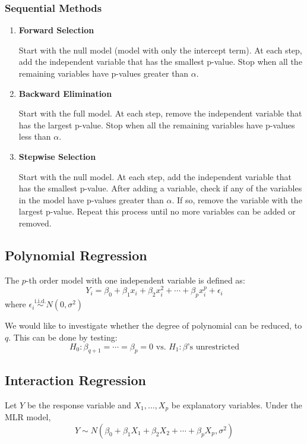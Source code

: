 \documentclass[11pt,a4paper]{article}
\begin{document}
\subsubsection{Sequential Methods}
\begin{enumerate}
    \item \textbf{Forward Selection} \par
        Start with the null model (model with only the intercept term). At each step, add the independent variable that has the smallest p-value. Stop when all the remaining variables have p-values greater than $\alpha$.
    
    \item \textbf{Backward Elimination} \par
        Start with the full model. At each step, remove the independent variable that has the largest p-value. Stop when all the remaining variables have p-values less than $\alpha$.

    \item \textbf{Stepwise Selection} \par
        Start with the null model. At each step, add the independent variable that has the smallest p-value. After adding a variable, check if any of the variables in the model have p-values greater than $\alpha$. If so, remove the variable with the largest p-value. Repeat this process until no more variables can be added or removed.

\end{enumerate}

\subsection{Polynomial Regression}
The $p$-th order model with one independent variable is defined as:
\[
Y_i = \beta_0 + \beta_1 x_i + \beta_2 x_i^2 + \cdots + \beta_p x_i^p + \epsilon_i
\]
where $\epsilon_i \overset{\text{i.i.d.}}{\sim} N(0, \sigma^2)$ \par
We would like to investigate whether the degree of polynomial can be reduced, to $q$. This can be done by testing:
\[
H_0: \beta_{q+1} = \cdots = \beta_p = 0 \text{ vs. } H_1: \beta \text{'s unrestricted}
\]

\subsection{Interaction Regression}
Let $Y$ be the response variable and $X_1, \dots, X_p$ be explanatory variables. Under the MLR model,
\[
Y \sim N(\beta_0 + \beta_1 X_1 + \beta_2 X_2 + \cdots + \beta_p X_p, \sigma^2)
\]
\end{document}
